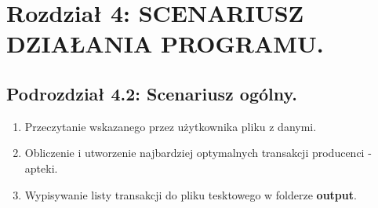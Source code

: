 \documentclass[a4paper]{article}
\begin{document}
\newpage
\section*{Rozdział 4: SCENARIUSZ DZIAŁANIA PROGRAMU.}
\subsection*{Podrozdział 4.2: Scenariusz ogólny.}
\begin{enumerate}
\item Przeczytanie wskazanego przez użytkownika pliku z danymi.
\item Obliczenie i utworzenie najbardziej optymalnych transakcji producenci - apteki.
\item Wypisywanie listy transakcji do pliku tesktowego w folderze \textbf{output}.
\end{enumerate}
\end{document}
